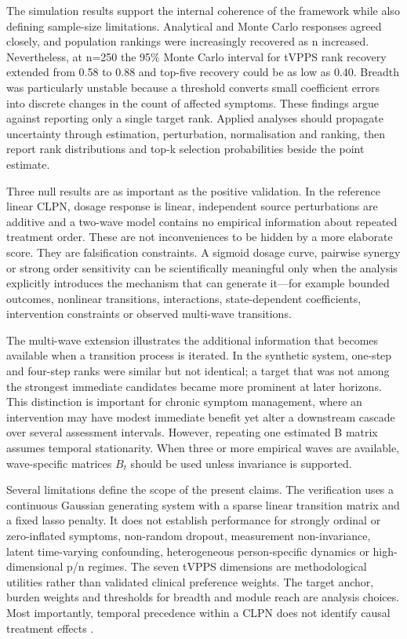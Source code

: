 \documentclass[11pt]{article}
\begin{document}
The simulation results support the internal coherence of the framework
while also defining sample-size limitations. Analytical and Monte Carlo
responses agreed closely, and population rankings were increasingly
recovered as n increased. Nevertheless, at n=250 the 95\% Monte Carlo
interval for tVPPS rank recovery extended from 0.58 to 0.88 and top-five
recovery could be as low as 0.40. Breadth was particularly unstable
because a threshold converts small coefficient errors into discrete
changes in the count of affected symptoms. These findings argue against
reporting only a single target rank. Applied analyses should propagate
uncertainty through estimation, perturbation, normalisation and ranking,
then report rank distributions and top-k selection probabilities beside
the point estimate.

Three null results are as important as the positive validation. In the
reference linear CLPN, dosage response is linear, independent source
perturbations are additive and a two-wave model contains no empirical
information about repeated treatment order. These are not inconveniences
to be hidden by a more elaborate score. They are falsification
constraints. A sigmoid dosage curve, pairwise synergy or strong order
sensitivity can be scientifically meaningful only when the analysis
explicitly introduces the mechanism that can generate it---for example
bounded outcomes, nonlinear transitions, interactions, state-dependent
coefficients, intervention constraints or observed multi-wave
transitions.

The multi-wave extension illustrates the additional information that
becomes available when a transition process is iterated. In the
synthetic system, one-step and four-step ranks were similar but not
identical; a target that was not among the strongest immediate
candidates became more prominent at later horizons. This distinction is
important for chronic symptom management, where an intervention may have
modest immediate benefit yet alter a downstream cascade over several
assessment intervals. However, repeating one estimated B matrix assumes
temporal stationarity. When three or more empirical waves are available,
wave-specific matrices \(B_t\) should be used unless invariance is supported.

Several limitations define the scope of the present claims. The
verification uses a continuous Gaussian generating system with a sparse
linear transition matrix and a fixed lasso penalty. It does not
establish performance for strongly ordinal or zero-inflated symptoms,
non-random dropout, measurement non-invariance, latent time-varying
confounding, heterogeneous person-specific dynamics or high-dimensional
p/n regimes. The seven tVPPS dimensions are methodological utilities
rather than validated clinical preference weights. The target anchor,
burden weights and thresholds for breadth and module reach are analysis
choices. Most importantly, temporal precedence within a CLPN does not
identify causal treatment effects \cite{ref5,ref6,ref16}.
\end{document}
